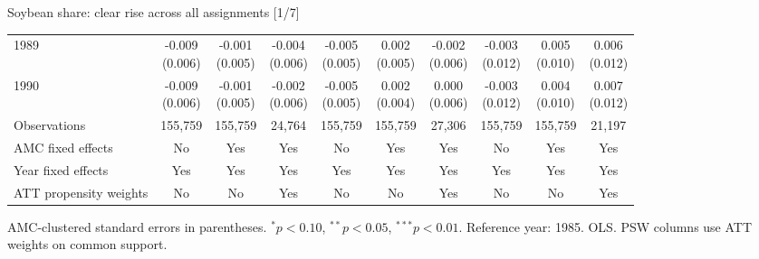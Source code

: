 \documentclass[aspectratio=169]{beamer}
\begin{document}
\begin{frame}{Soybean share: clear rise across all assignments [1/7]}
{\begin{tabular}{@{}l*{9}{c}@{}}
1989 & \shortstack{-0.009\\(0.006)} & \shortstack{-0.001\\(0.005)} & \shortstack{-0.004\\(0.006)} & \shortstack{-0.005\\(0.005)} & \shortstack{0.002\\(0.005)} & \shortstack{-0.002\\(0.006)} & \shortstack{-0.003\\(0.012)} & \shortstack{0.005\\(0.010)} & \shortstack{0.006\\(0.012)} \\
1990 & \shortstack{-0.009\\(0.006)} & \shortstack{-0.001\\(0.005)} & \shortstack{-0.002\\(0.006)} & \shortstack{-0.005\\(0.005)} & \shortstack{0.002\\(0.004)} & \shortstack{0.000\\(0.006)} & \shortstack{-0.003\\(0.012)} & \shortstack{0.004\\(0.010)} & \shortstack{0.007\\(0.012)} \\
\midrule
Observations & 155,759 & 155,759 & 24,764 & 155,759 & 155,759 & 27,306 & 155,759 & 155,759 & 21,197 \\
AMC fixed effects & No & Yes & Yes & No & Yes & Yes & No & Yes & Yes \\
Year fixed effects & Yes & Yes & Yes & Yes & Yes & Yes & Yes & Yes & Yes \\
ATT propensity weights & No & No & Yes & No & No & Yes & No & No & Yes \\
\bottomrule
\end{tabular}%
}
\vspace{0.1em}
{\tiny\color{ZMidGray} AMC-clustered standard errors in parentheses. $^{*}p<0.10$, $^{**}p<0.05$, $^{***}p<0.01$. Reference year: 1985. OLS. PSW columns use ATT weights on common support.}
\end{frame}
\end{document}
